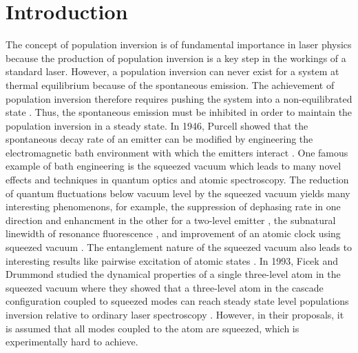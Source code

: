 \documentclass[aps,showpacs,twocolumn,twoside,groupedaddress]{revtex4}
\begin{document}
\section{Introduction}
The concept of population inversion is of fundamental importance in laser physics because the production of population inversion is a key step in the workings of a standard laser. However, a population inversion can never exist for a system at thermal equilibrium because of the spontaneous emission. The achievement of population inversion therefore requires pushing the system into a non-equilibrated state  \cite{svelto1998principles}. Thus, the spontaneous emission must be inhibited in order to maintain the population inversion in a steady state. In 1946, Purcell showed that the spontaneous decay rate of an emitter can be modified by engineering the electromagnetic bath environment with which the emitters interact \cite{purcell1946purcell}. One famous example of bath engineering is the squeezed vacuum which leads to many novel effects and techniques in quantum optics and atomic spectroscopy. The reduction of quantum fluctuations below vacuum level by the squeezed vacuum yields many interesting phenomenons, for example, the suppression of dephasing rate in one direction and enhancment in the other for a two-level emitter \cite{gardiner1986cw, collett1984mj,gea1988vacuum,palma1989gm, agarwal1990cooperative, ficek1990spontaneous,ficek1991z, goldstein1996ev}, the subnatural linewidth of resonance fluorescence \cite{carmichael1987, toyli2016resonance}, and improvement of an atomic clock using squeezed vacuum \cite{Kruse}. The entanglement nature of the squeezed vacuum also leads to interesting results like pairwise excitation of atomic states \cite{tanas2004stationary, li2006preparing, You2018}. In 1993, Ficek and Drummond studied the dynamical properties of a single three-level atom in the squeezed vacuum where they showed that a three-level atom in the cascade configuration coupled to squeezed modes can reach steady state level populations inversion relative to ordinary laser spectroscopy \cite{ficek1991three, ficek1991three2, ficek1993two}. However, in their proposals, it is assumed that all modes coupled to the atom are squeezed, which is experimentally hard to achieve.
\end{document}
